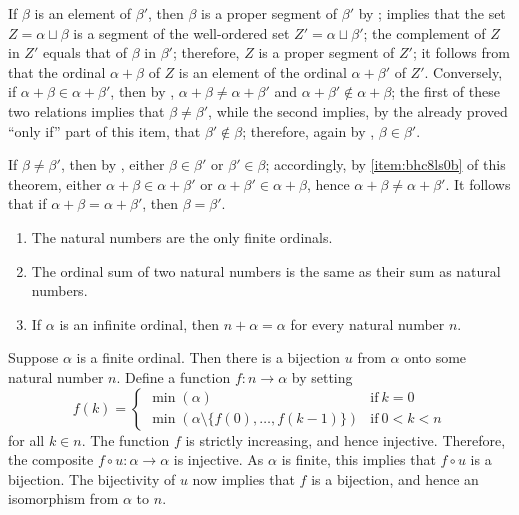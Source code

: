 \documentclass{article}
\begin{document}
If \(\beta\) is an element of \(\beta'\), then \(\beta\) is a proper
segment of \(\beta'\) by ; 
implies that the set \(Z = \alpha \sqcup \beta\) is a segment of the
well-ordered set \(Z' = \alpha \sqcup \beta'\); the complement of
\(Z\) in \(Z'\) equals that of \(\beta\) in \(\beta'\); therefore,
\(Z\) is a proper segment of \(Z'\); it follows from
 that the ordinal \(\alpha + \beta\) of \(Z\) is an
element of the ordinal \(\alpha + \beta'\) of \(Z'\).  Conversely, if
\(\alpha + \beta \in \alpha + \beta'\), then by ,
\(\alpha + \beta \neq \alpha + \beta'\) and
\(\alpha + \beta' \notin \alpha + \beta\); the first of these two
relations implies that \(\beta \neq \beta'\), while the second
implies, by the already proved ``only if'' part of this item, that
\(\beta' \notin \beta\); therefore, again by ,
\(\beta \in \beta'\).

If \(\beta \neq \beta'\), then by , either
\(\beta \in \beta'\) or \(\beta' \in \beta\); accordingly, by
\cref{item:bhc8ls0b} of this theorem, either
\(\alpha + \beta \in \alpha + \beta'\) or
\(\alpha + \beta' \in \alpha + \beta\), hence
\(\alpha + \beta \neq \alpha + \beta'\).  It follows that if
\(\alpha + \beta = \alpha + \beta'\), then \(\beta = \beta'\).

\begin{theorem}
  \label{thm:udacgei9}
  \begin{enumerate}
  \item The natural numbers are the only finite ordinals.
  \item The ordinal sum of two natural numbers is the same as their
    sum as natural numbers.
  \item If \(\alpha\) is an infinite ordinal, then
    \(n + \alpha = \alpha\) for every natural number \(n\).
  \end{enumerate}
\end{theorem}

Suppose \(\alpha\) is a finite ordinal.  Then there is a bijection
\(u\) from \(\alpha\) onto some natural number \(n\).  Define a
function \(f : n \to \alpha\) by setting
\begin{displaymath}
  f(k) =
  \begin{cases}
    \min(\alpha)
    & \text{if} ~ k = 0 \\
    \min(\alpha \setminus \{f(0), \dotsc, f(k-1)\})
    & \text{if} ~ 0 < k < n
  \end{cases}
\end{displaymath}
for all \(k \in n\).  The function \(f\) is strictly increasing, and
hence injective.  Therefore, the composite
\(f \circ u : \alpha \to \alpha\) is injective.  As \(\alpha\) is
finite, this implies that \(f \circ u\) is a bijection.  The
bijectivity of \(u\) now implies that \(f\) is a bijection, and hence
an isomorphism from \(\alpha\) to \(n\).
\end{document}

